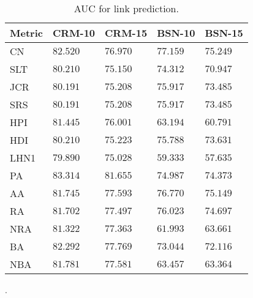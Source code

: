 \begin{table}[h]
	\centering
	\begin{tabular}{l l l l l}
	\toprule
	\textbf{Metric} & \textbf{CRM-10} & \textbf{CRM-15} & \textbf{BSN-10} & \textbf{BSN-15}\\
	\midrule
		CN   & $82.520$ & $76.970$ & $77.159$ & $75.249$ \\
		SLT  & $80.210$ & $75.150$ & $74.312$ & $70.947$ \\
		JCR  & $80.191$ & $75.208$ & $75.917$ & $73.485$ \\
		SRS  & $80.191$ & $75.208$ & $75.917$ & $73.485$ \\
		HPI  & $81.445$ & $76.001$ & $63.194$ & $60.791$ \\
		HDI  & $80.210$ & $75.223$ & $75.788$ & $73.631$ \\
		LHN1 & $79.890$ & $75.028$ & $59.333$ & $57.635$ \\
		PA   & $83.314$ & $81.655$ & $74.987$ & $74.373$ \\
		AA   & $81.745$ & $77.593$ & $76.770$ & $75.149$ \\
		RA   & $81.702$ & $77.497$ & $76.023$ & $74.697$ \\
		NRA  & $81.322$ & $77.363$ & $61.993$ & $63.661$ \\
		BA   & $82.292$ & $77.769$ & $73.044$ & $72.116$ \\
		NBA  & $81.781$ & $77.581$ & $63.457$ & $63.364$ \\
	\bottomrule
	\end{tabular}
	\caption{AUC for link prediction.}
	\label{tab:auc-prediction}
\end{table}	

.


